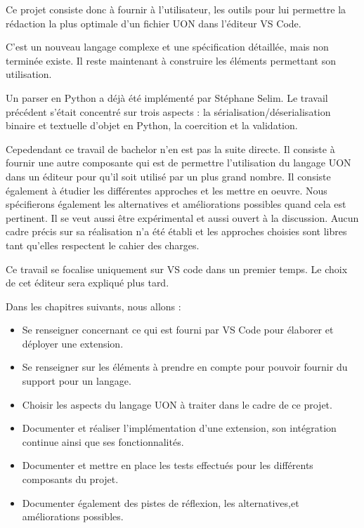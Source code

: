 \documentclass[
    iict, %
    il, %
]{heig-tb}
\begin{document}
Ce projet consiste donc à fournir à l'utilisateur, les outils pour lui permettre la rédaction la plus optimale d'un fichier UON dans l'éditeur VS Code.

C'est un nouveau langage complexe et une spécification détaillée, mais non terminée existe. Il reste maintenant à construire les éléments permettant son utilisation.

Un parser en Python a déjà été implémenté par Stéphane Selim.
Le travail précédent s'était concentré sur trois aspects : la sérialisation/déserialisation binaire et textuelle d'objet en Python, la coercition et la validation.

Cepedendant ce travail de bachelor n'en est pas la suite directe.
Il consiste à fournir une autre composante qui est de permettre l'utilisation du langage UON dans un éditeur pour qu'il soit utilisé par un plus grand nombre.
Il consiste également à étudier les différentes approches et les mettre en oeuvre. Nous spécifierons également les alternatives et améliorations possibles quand cela est pertinent.
Il se veut aussi être expérimental et aussi ouvert à la discussion.
Aucun cadre précis sur sa réalisation n'a été établi et les approches choisies sont libres tant qu'elles respectent le cahier des charges.

Ce travail se focalise uniquement sur VS code dans un premier temps. Le choix de cet éditeur sera expliqué plus tard.

Dans les chapitres suivants, nous allons :

\begin{itemize}
    \item Se renseigner concernant ce qui est fourni par VS Code pour élaborer et déployer une extension.
    \item Se renseigner sur les éléments à prendre en compte pour pouvoir fournir du support pour un langage.
    \item Choisir les aspects du langage UON à traiter dans le cadre de ce projet.
    \item Documenter et réaliser l'implémentation d'une extension, son intégration continue ainsi que ses fonctionnalités.
    \item Documenter et mettre en place les tests effectués pour les différents composants du projet.
    \item Documenter également des pistes de réflexion, les alternatives,et améliorations possibles.
\end{itemize}

\let\cleardoublepage\clearpage
\end{document}
